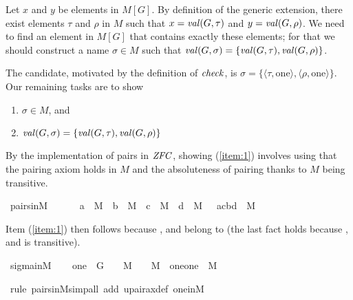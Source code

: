 Let $x$ and $y$ be elements in $M[G]$. By definition of the generic extension, there exist
elements $\tau$ and $\rho$ in $M$ such that $x = \operatorname{\mathit{val}}(G,\tau)$ and
$y = \operatorname{\mathit{val}}(G,\rho)$.  We need to find an element in $M[G]$ that contains exactly
these elements; for that we should construct a name $\sigma\in M$ such that
$\operatorname{\mathit{val}}(G,\sigma) = \{ \operatorname{\mathit{val}}(G,\tau) , \operatorname{\mathit{val}}(G,\rho) \}$. 

The candidate, motivated by the definition of $\operatorname{\mathit{check}}$,  is
$\sigma = \{\langle \tau , \mathrm{one} \rangle , \langle \rho , \mathrm{one} \rangle \}$. 
Our remaining tasks are to show 
\begin{enumerate}
  \item \label{item:1}$\sigma \in M$, and
  \item \label{item:2} $\operatorname{\mathit{val}}(G,\sigma) = \{ \operatorname{\mathit{val}}(G,\tau) , \operatorname{\mathit{val}}(G,\rho) \}$
\end{enumerate}

By the implementation of pairs  in $\mathit{ZFC}$, showing (\ref{item:1})
involves using that the
pairing axiom holds in $M$ and the absoluteness of pairing
thanks to $M$ being transitive. 

\begin{isabelle}
\isamarkupfalse%
\ pairs{\isacharunderscore}in{\isacharunderscore}M\ {\isacharcolon}\ \isanewline
\ \ {\isachardoublequoteopen}\ {\isasymlbrakk}\ a\ {\isasymin}\ M\ {\isacharsemicolon}\ b\ {\isasymin}\ M\ {\isacharsemicolon}\ c\ {\isasymin}\ M\ {\isacharsemicolon}\ d\ {\isasymin}\ M\ {\isasymrbrakk}\ {\isasymLongrightarrow}\ {\isacharbraceleft}{\isasymlangle}a{\isacharcomma}c{\isasymrangle}{\isacharcomma}{\isasymlangle}b{\isacharcomma}d{\isasymrangle}{\isacharbraceright}\ {\isasymin}\ M{\isachardoublequoteclose}
\end{isabelle}

Item (\ref{item:1}) then follows because \isa{\isasymtau}, \isa{\isasymrho} and
 belong to  (the last fact holds because ,  and
 is transitive).

\begin{isabelle}
\isamarkupfalse%
\ sigma{\isacharunderscore}in{\isacharunderscore}M\ {\isacharcolon}\isanewline
\ \ {\isachardoublequoteopen} one\ {\isasymin}\ G\ {\isasymLongrightarrow}\ {\isasymtau}\ {\isasymin}\ M\ {\isasymLongrightarrow}\ {\isasymrho}\ {\isasymin}\ M\ {\isasymLongrightarrow}\ {\isacharbraceleft}{\isasymlangle}{\isasymtau}{\isacharcomma}one{\isasymrangle}{\isacharcomma}{\isasymlangle}{\isasymrho}{\isacharcomma}one{\isasymrangle}{\isacharbraceright}\ {\isasymin}\ M{\isachardoublequoteclose}

\isamarkupfalse%
\ {\isacharparenleft}rule\ pairs{\isacharunderscore}in{\isacharunderscore}M{\isacharcomma}simp{\isacharunderscore}all\ add{\isacharcolon}\ upair{\isacharunderscore}ax{\isacharunderscore}def\ one{\isacharunderscore}in{\isacharunderscore}M{\isacharparenright}%
\end{isabelle}

